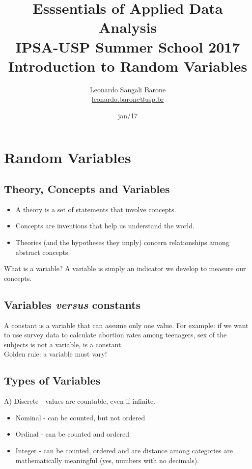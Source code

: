 \documentclass[11pt]{article}
\title{\textbf{Esssentials of Applied Data Analysis\\
				IPSA-USP Summer School 2017}\newline\\
				Introduction to Random Variables}
\author{Leonardo Sangali Barone\\ \href{leonardo.barone@usp.br}{leonardo.barone@usp.br}}
\date{jan/17}
\begin{document}
\maketitle

\section*{Random Variables}

	\subsection*{Theory, Concepts and Variables}

	\begin{itemize}

	\item A theory is a set of statements that involve concepts.
	\item Concepts are inventions that help us understand the world.
	\item Theories (and the hypotheses they imply) concern relationships among abstract concepts.
	\end{itemize}
	What is a variable? A variable is simply an indicator we develop to measure our concepts.


	\subsection*{Variables \emph{versus} constants}
	A constant is a variable that can assume only one value. For example: if we want to use survey data to calculate abortion rates among teenagers, sex of the subjects is not a variable, is a constant\\
	
	Golden rule: a variable must vary!


	\subsection*{Types of Variables}
	
	A) Discrete - values are countable, even if infinite.
	
	\begin{itemize}
		\item Nominal - can be counted, but not ordered
		\item Ordinal - can be counted and ordered
		\item Integer - can be counted, ordered and are distance among categories are mathematically meaningful (yes, numbers with no decimals).
	\end{itemize}
	
\end{document}

